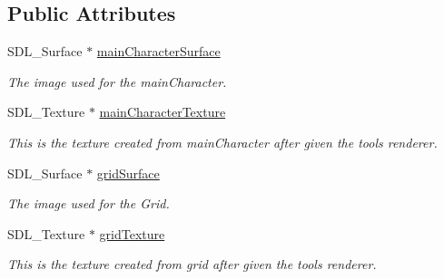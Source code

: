 \subsection*{Public Attributes}
\begin{DoxyCompactItemize}
\item 
\mbox{\label{class_resource_manager_a7dea3b6c85cc513e432c37b3be589ba2}} 
S\+D\+L\+\_\+\+Surface $\ast$ \mbox{\hyperlink{class_resource_manager_a7dea3b6c85cc513e432c37b3be589ba2}{main\+Character\+Surface}}
\begin{DoxyCompactList}\small\item\em The image used for the main\+Character. \end{DoxyCompactList}\item 
\mbox{\label{class_resource_manager_a671fa64fc93e8fad27e25fdcfddbc982}} 
S\+D\+L\+\_\+\+Texture $\ast$ \mbox{\hyperlink{class_resource_manager_a671fa64fc93e8fad27e25fdcfddbc982}{main\+Character\+Texture}}
\begin{DoxyCompactList}\small\item\em This is the texture created from main\+Character after given the tool\textquotesingle{}s renderer. \end{DoxyCompactList}\item 
\mbox{\label{class_resource_manager_ae18dd7848383c33c861b2ca6e484324e}} 
S\+D\+L\+\_\+\+Surface $\ast$ \mbox{\hyperlink{class_resource_manager_ae18dd7848383c33c861b2ca6e484324e}{grid\+Surface}}
\begin{DoxyCompactList}\small\item\em The image used for the Grid. \end{DoxyCompactList}\item 
\mbox{\label{class_resource_manager_acad3b91a9c5c4c9fa86175ca4cd8daa2}} 
S\+D\+L\+\_\+\+Texture $\ast$ \mbox{\hyperlink{class_resource_manager_acad3b91a9c5c4c9fa86175ca4cd8daa2}{grid\+Texture}}
\begin{DoxyCompactList}\small\item\em This is the texture created from grid after given the tool\textquotesingle{}s renderer. \end{DoxyCompactList}\item 
\mbox{\label{class_resource_manager_a0e0b66dfe90518eb1fc03ec90fc72c0e}} 

\end{DoxyCompactItemize}
